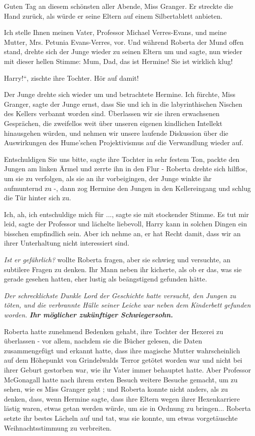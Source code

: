 \glqq{}Guten Tag an diesem schönsten aller Abende, Miss Granger.\grqq{} Er streckte die
Hand zurück, als würde er seine Eltern auf einem Silbertablett anbieten.

\glqq{}Ich stelle Ihnen meinen Vater, Professor Michael Verres-Evans, und meine
Mutter, Mrs. Petunia Evans-Verres, vor.\grqq{} Und während Roberta der Mund offen
stand, drehte sich der Junge wieder zu seinen Eltern um und sagte, nun wieder
mit dieser hellen Stimme: \glqq{}Mum, Dad, das ist Hermine! Sie ist wirklich
klug!\grqq{}

\glqq{}Harry!“, zischte ihre Tochter. \glqq{}Hör auf damit!\grqq{}

Der Junge drehte sich wieder um und betrachtete Hermine. \glqq{}Ich fürchte, Miss
Granger\grqq{}, sagte der Junge ernst, \glqq{}dass Sie und ich in die
labyrinthischen Nischen des Kellers verbannt worden sind. Überlassen wir sie
ihren erwachsenen Gesprächen, die zweifellos weit über unseren eigenen
kindlichen Intellekt hinausgehen würden, und nehmen wir unsere laufende
Diskussion über die Auswirkungen des Hume'schen Projektivismus auf die
Verwandlung wieder auf.\grqq{}

\glqq{}Entschuldigen Sie uns bitte\grqq{}, sagte ihre Tochter in sehr festem Ton,
packte den Jungen am linken Ärmel und zerrte ihn in den Flur - Roberta drehte
sich hilflos, um sie zu verfolgen, als sie an ihr vorbeigingen, der Junge winkte
ihr aufmunternd zu -, dann zog Hermine den Jungen in den Kellereingang und
schlug die Tür hinter sich zu.

\glqq{}Ich, ah, ich entschuldige mich für ...\grqq{}, sagte sie mit stockender
Stimme. \glqq{}Es tut mir leid\grqq{}, sagte der Professor und lächelte
liebevoll, \glqq{}Harry kann in solchen Dingen ein bisschen empfindlich sein.
Aber ich nehme an, er hat Recht damit, dass wir an ihrer Unterhaltung nicht
interessiert sind.\grqq{}

\emph{Ist er gefährlich?} wollte Roberta fragen, aber sie schwieg und
versuchte, an subtilere Fragen zu denken. Ihr Mann neben ihr kicherte, als ob er
das, was sie gerade gesehen hatten, eher lustig als beängstigend gefunden hätte.

\emph{Der schrecklichste Dunkle Lord der Geschichte hatte versucht, den Jungen
zu töten, und die verbrannte Hülle seiner Leiche war neben dem Kinderbett
gefunden worden.}
\textbf{\emph{ Ihr möglicher zukünftiger Schwiegersohn.} }

Roberta hatte zunehmend Bedenken gehabt, ihre Tochter der Hexerei zu überlassen
- vor allem, nachdem sie die Bücher gelesen, die Daten zusammengefügt und
erkannt hatte, dass ihre magische Mutter wahrscheinlich auf dem Höhepunkt von
Grindelwalds Terror getötet worden war und nicht bei ihrer Geburt gestorben war,
wie ihr Vater immer behauptet hatte. Aber Professor McGonagall hatte nach ihrem
ersten Besuch weitere Besuche gemacht, um \glqq{}zu sehen, wie es Miss Granger
geht\grqq{} ; und Roberta konnte nicht anders, als zu denken, dass, wenn Hermine
sagte, dass ihre Eltern wegen ihrer Hexenkarriere lästig waren, etwas getan
werden würde, um sie in Ordnung zu bringen... Roberta setzte ihr bestes Lächeln
auf und tat, was sie konnte, um etwas vorgetäuschte Weihnachtsstimmung zu
verbreiten.

